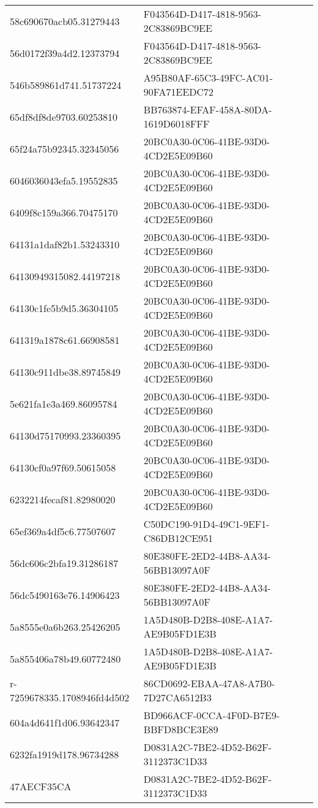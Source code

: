 \begin{tabular}{ll}
58c690670acb05.31279443 & F043564D-D417-4818-9563-2C83869BC9EE \\
56d0172f39a4d2.12373794 & F043564D-D417-4818-9563-2C83869BC9EE \\
546b589861d741.51737224 & A95B80AF-65C3-49FC-AC01-90FA71EEDC72 \\
65df8df8de9703.60253810 & BB763874-EFAF-458A-80DA-1619D6018FFF \\
65f24a75b92345.32345056 & 20BC0A30-0C06-41BE-93D0-4CD2E5E09B60 \\
6046036043efa5.19552835 & 20BC0A30-0C06-41BE-93D0-4CD2E5E09B60 \\
6409f8c159a366.70475170 & 20BC0A30-0C06-41BE-93D0-4CD2E5E09B60 \\
64131a1daf82b1.53243310 & 20BC0A30-0C06-41BE-93D0-4CD2E5E09B60 \\
64130949315082.44197218 & 20BC0A30-0C06-41BE-93D0-4CD2E5E09B60 \\
64130c1fe5b9d5.36304105 & 20BC0A30-0C06-41BE-93D0-4CD2E5E09B60 \\
641319a1878c61.66908581 & 20BC0A30-0C06-41BE-93D0-4CD2E5E09B60 \\
64130c911dbe38.89745849 & 20BC0A30-0C06-41BE-93D0-4CD2E5E09B60 \\
5e621fa1e3a469.86095784 & 20BC0A30-0C06-41BE-93D0-4CD2E5E09B60 \\
64130d75170993.23360395 & 20BC0A30-0C06-41BE-93D0-4CD2E5E09B60 \\
64130cf0a97f69.50615058 & 20BC0A30-0C06-41BE-93D0-4CD2E5E09B60 \\
6232214fecaf81.82980020 & 20BC0A30-0C06-41BE-93D0-4CD2E5E09B60 \\
65ef369a4df5c6.77507607 & C50DC190-91D4-49C1-9EF1-C86DB12CE951 \\
56dc606c2bfa19.31286187 & 80E380FE-2ED2-44B8-AA34-56BB13097A0F \\
56dc5490163e76.14906423 & 80E380FE-2ED2-44B8-AA34-56BB13097A0F \\
5a8555e0a6b263.25426205 & 1A5D480B-D2B8-408E-A1A7-AE9B05FD1E3B \\
5a855406a78b49.60772480 & 1A5D480B-D2B8-408E-A1A7-AE9B05FD1E3B \\
r-7259678335.1708946fd4d502 & 86CD0692-EBAA-47A8-A7B0-7D27CA6512B3 \\
604a4d641f1d06.93642347 & BD966ACF-0CCA-4F0D-B7E9-BBFD8BCE3E89 \\
6232fa1919d178.96734288 & D0831A2C-7BE2-4D52-B62F-3112373C1D33 \\
47AECF35CA & D0831A2C-7BE2-4D52-B62F-3112373C1D33 \\

\end{tabular}
